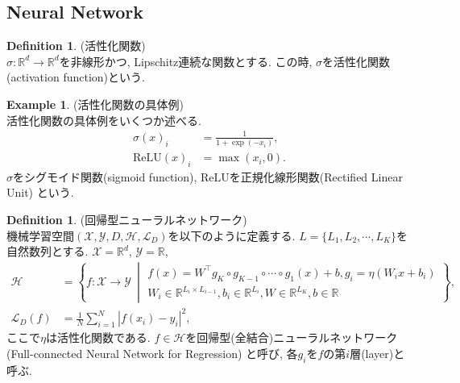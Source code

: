 \documentclass[11pt, a4paper, dvipdfmx]{jsarticle}
\theoremstyle{definition}
\newtheorem{Definition+}[Axiom+]{Definition}
\newtheorem{Example+}[Axiom+]{Example}
\newcommand{\R}{\mathbb{R}}
\newcommand{\X}{\mathcal{X}}
\newcommand{\Y}{\mathcal{Y}}
\newcommand{\Hil}{\mathcal{H}}
\newcommand{\Loss}{\mathcal{L}_{D}}
\newcommand{\MLsp}{(\X, \Y, D, \Hil, \Loss)}
\begin{document}
\subsection{Neural Network}
\begin{Definition+}(活性化関数)\\
    $\sigma:\R^{d}\to\R^{d}$を非線形かつ, Lipschitz連続な関数とする. 
    この時, $\sigma$を活性化関数(activation function)という.
\end{Definition+}
\begin{Example+}(活性化関数の具体例)\\
    活性化関数の具体例をいくつか述べる. 
    \begin{align*}
        \sigma(x)_{i} &= \frac{1}{1 + \exp(-x_{i})},\\
        \text{ReLU}(x)_{i} &= \max(x_{i}, 0).
    \end{align*}
    $\sigma$をシグモイド関数(sigmoid function), $\text{ReLU}$を正規化線形関数(Rectified Linear Unit)
    という.
\end{Example+}
\begin{Definition+}(回帰型ニューラルネットワーク)\\
    機械学習空間$\MLsp$を以下のように定義する. $L = \{L_{1}, L_{2}, \cdots, L_{K}\}$を自然数列とする.
    $\X = \R^d$, $\Y = \R$, 
    \begin{align*}
        \Hil &= \left\{f:\X\to\Y~\middle|
        \begin{array}{l}
            f(x) = W^{\top}g_{K}\circ g_{K - 1}\circ\cdots\circ g_{1}(x) + b, g_{i} = \eta(W_{i}x + b_{i})\\
            W_{i}\in\R^{L_{i}\times L_{i - 1}}, b_{i}\in\R^{L_{i}}, W\in\R^{L_{K}}, b\in\R
        \end{array}
        \right\},\\
        \Loss(f) &= \frac{1}{N}\sum_{i = 1}^{N}|f(x_i) - y_i|^2,
    \end{align*}
    ここで$\eta$は活性化関数である. $f\in\Hil$を回帰型(全結合)ニューラルネットワーク(Full-connected Neural Network for Regression)
    と呼び, 各$g_{i}$を$f$の第$i$層(layer)と呼ぶ.
\end{Definition+}
\end{document}
